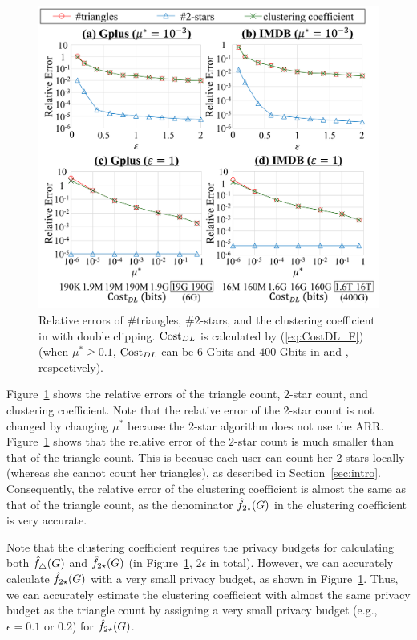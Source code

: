 \begin{figure}[t]
  \centering
  \includegraphics[width=0.99\linewidth]{fig/res5_cluster.pdf}
  \vspace{-4mm}
  \caption{Relative errors of \#triangles, \#$2$-stars, and the clustering coefficient in \AlgTwo{} with double clipping.
  $\mathrm{Cost}_{DL}$ is calculated by (\ref{eq:CostDL_F})
  (when $\mu^* \geq 0.1$,
  $\mathrm{Cost}_{DL}$ can be $6$ Gbits and $400$ Gbits in \GPlus{} and \IMDB{}, respectively).
  }
  \label{fig:res5_cluster}
\end{figure}

Figure~\ref{fig:res5_cluster} shows the relative errors of the triangle count, $2$-star count, and clustering coefficient.
Note that the relative error of the 2-star count is not changed by changing
$\mu^*$
because the 2-star algorithm does not use the ARR.
Figure~\ref{fig:res5_cluster} shows that the relative error of the $2$-star count is much smaller than that of the triangle count.
This is because each user can count her 2-stars locally (whereas she cannot count her triangles), as described in Section~\ref{sec:intro}.
Consequently, the relative error of the clustering coefficient is almost the same as that of the triangle count, as the denominator $\hat{f}_{2\star}(G)$ in the clustering coefficient is very accurate.

Note that the clustering coefficient requires the privacy budgets for
calculating both $\hat{f}_\triangle(G)$ and $\hat{f}_{2\star}(G)$
(in Figure~\ref{fig:res5_cluster}, $2\epsilon$ in total).
However, we can accurately
calculate $\hat{f}_{2\star}(G)$
with a very small privacy budget, as shown in Figure~\ref{fig:res5_cluster}.
Thus, we can accurately estimate the clustering coefficient with almost the same privacy budget as
the triangle count
by assigning a very small privacy budget (e.g., $\epsilon=0.1$ or $0.2$) for
$\hat{f}_{2\star}(G)$.

